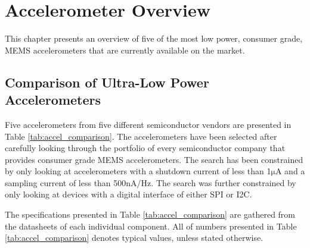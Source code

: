 \chapter{Accelerometer Overview}
\label{chap:overview}

This chapter presents an overview of five of the most low power, consumer grade, MEMS accelerometers that are currently available on the market.

\section{Comparison of Ultra-Low Power Accelerometers}

Five accelerometers from five different semiconductor vendors are presented in Table \ref{tab:accel_comparison}. The accelerometers have been selected after carefully looking through the portfolio of every semiconductor company that provides consumer grade MEMS accelerometers. The search has been constrained by only looking at accelerometers with a shutdown current of less than 1$\si{\micro\ampere}$ and a sampling current of less than 500$\si{\nano\ampere}$/Hz. The search was further constrained by only looking at devices with a digital interface of either SPI or I2C.

The specifications presented in Table \ref{tab:accel_comparison} are gathered from the datasheets of each individual component. All of numbers presented in Table \ref{tab:accel_comparison} denotes typical values, unless stated otherwise.

